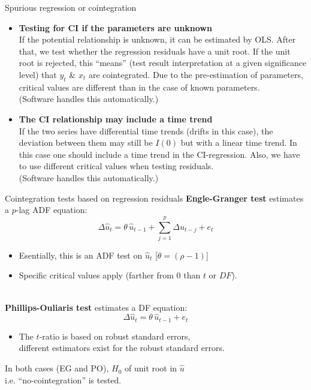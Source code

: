\documentclass{beamer}
\begin{document}
\begin{frame}{Spurious regression or cointegration}
\begin{itemize}
\item \textbf{Testing for CI if the parameters are unknown}\\ \smallskip
If the potential relationship is unknown, it can be estimated by OLS. After that, we test whether the regression residuals have a unit root. If the unit root is rejected, this ``means'' (test result interpretation at a given significance level) that $y_t$ \& $x_t$ are cointegrated. Due to the pre-estimation of parameters, critical values are different than in the case of known parameters. \\(Software handles this automatically.)
\item \textbf{The CI relationship may include a time trend}\\ \smallskip
If the two series have differential time trends (drifts in this case), the deviation between them may still be $I(0)$ but with a linear time trend. In this case one should include a time trend in the CI-regression. Also, we have to use different critical values when testing residuals.
\\(Software handles this automatically.)
\end{itemize}
\end{frame}
\begin{frame}{Cointegration tests based on regression residuals}
\textbf{Engle-Granger test} estimates a $p$-lag ADF equation:\\
$$
\Delta \hat{u}_t = \theta \, \hat{u}_{t-1} +
\sum_{j=1}^p \Delta \hat{u}_{t-j} + e_t
$$
\begin{itemize}
    \item Esentially, this is an ADF test on $\hat{u}_t$ [$\theta = (\rho -1)$]
    \item Specific critical values apply (farther from 0 than $t$ or $DF$).\\~\\
\end{itemize}

\textbf{Phillips-Ouliaris test} estimates a DF equation:\\
\vspace{-0.3cm}
$$\Delta \hat{u}_t = \theta \, \hat{u}_{t-1} + e_t$$
\vspace{-0.5cm}
\begin{itemize}
    \item The $t$-ratio is based on robust standard errors,\\different estimators exist for the robust standard errors.
\end{itemize}
\medskip
In both cases (EG and PO), $H_0$ of unit root in $\hat{u}$ \\i.e. ``no-cointegration'' is tested.
\end{frame}
\end{document}
